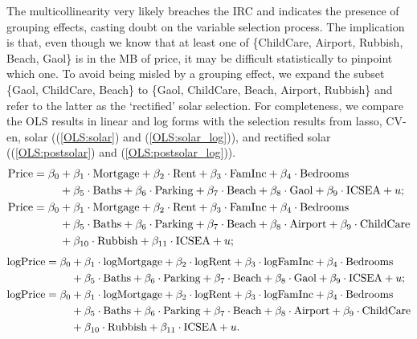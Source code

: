 \documentclass[11pt,review,authoryear]{elsarticle}
\begin{document}
The multicollinearity very likely breaches the IRC and indicates the presence of grouping effects, casting doubt on the variable selection process. The implication is that, even though we know that at least one of \{ChildCare, Airport, Rubbish, Beach, Gaol\} is in the MB of price, it may be difficult statistically to pinpoint which one. To avoid being misled by a grouping effect, we expand the subset \{Gaol, ChildCare, Beach\} to \{Gaol, ChildCare, Beach, Airport, Rubbish\} and refer to the latter as the `rectified' solar selection. For completeness, we compare the OLS results in linear and log forms with the selection results from lasso, CV-en, solar ((\ref{OLS:solar}) and (\ref{OLS:solar_log})), and rectified solar ((\ref{OLS:postsolar}) and (\ref{OLS:postsolar_log})).
%
\begin{align}
  \mathrm{Price} = \beta_0 & + \beta_1 \cdot \mathrm{Mortgage} + \beta_2 \cdot \mathrm{Rent} +
  \beta_3 \cdot \mathrm{FamInc} + \beta_4 \cdot \mathrm{Bedrooms} \label{OLS:solar} \\
  & + \beta_5 \cdot \mathrm{Baths} + \beta_6 \cdot \mathrm{Parking} + \beta_7 \cdot \mathrm{Beach} + \beta_8 \cdot \mathrm{Gaol} + \beta_9 \cdot \mathrm{ICSEA} + u; \notag \\
  \mathrm{Price} = \beta_0 & + \beta_1 \cdot \mathrm{Mortgage} + \beta_2 \cdot \mathrm{Rent}
  + \beta_3 \cdot \mathrm{FamInc} + \beta_4 \cdot \mathrm{Bedrooms}  \label{OLS:postsolar} \\
  & + \beta_5 \cdot \mathrm{Baths} + \beta_6 \cdot \mathrm{Parking}  + \beta_7 \cdot \mathrm{Beach} + \beta_8 \cdot \mathrm{Airport} + \beta_9 \cdot \mathrm{ChildCare} \notag   \\
  & + \beta_{10} \cdot \mathrm{Rubbish} + \beta_{11} \cdot \mathrm{ICSEA} + u; \notag
\end{align}
\begin{align}
  \mathrm{logPrice} = \beta_0 & + \beta_1 \cdot \mathrm{logMortgage} +
  \beta_2 \cdot \mathrm{logRent} + \beta_3 \cdot \mathrm{logFamInc} + \beta_4 \cdot \mathrm{Bedrooms} \label{OLS:solar_log} \\
  & + \beta_5 \cdot \mathrm{Baths} + \beta_6 \cdot \mathrm{Parking} + \beta_7 \cdot \mathrm{Beach} + \beta_8 \cdot \mathrm{Gaol} + \beta_9 \cdot \mathrm{ICSEA} + u; \notag \\
  \mathrm{logPrice} = \beta_0 & + \beta_1 \cdot \mathrm{logMortgage}
  + \beta_2 \cdot \mathrm{logRent}
  + \beta_3 \cdot \mathrm{logFamInc} + \beta_4 \cdot \mathrm{Bedrooms}  \label{OLS:postsolar_log} \\
  & + \beta_5 \cdot \mathrm{Baths} + \beta_6 \cdot \mathrm{Parking}  + \beta_7 \cdot \mathrm{Beach} + \beta_8 \cdot \mathrm{Airport} + \beta_9 \cdot \mathrm{ChildCare} \notag   \\
  & + \beta_{10} \cdot \mathrm{Rubbish} + \beta_{11} \cdot \mathrm{ICSEA} + u. \notag
\end{align}
\end{document}
